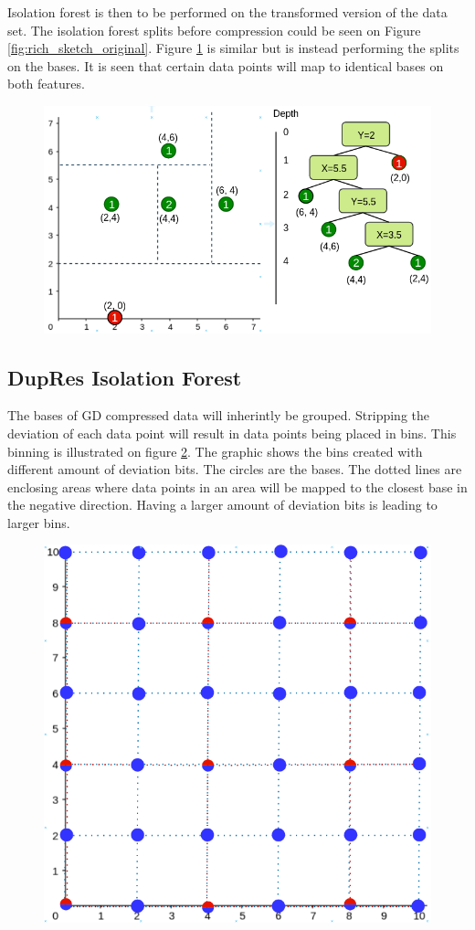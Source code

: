 Isolation forest is then to be performed on the transformed version of the data set. The isolation forest splits before compression could be seen on Figure \ref{fig:rich_sketch_original}. Figure \ref{fig:rich_sketch_bases} is similar but is instead performing the splits on the bases. It is seen that certain data points will map to identical bases on both features.  

\begin{figure}
  \centering
  \includegraphics[width=\linewidth]{images/rich_sketch_bases.png}
  \caption{}
  \label{fig:rich_sketch_bases}
\end{figure}


\subsection{DupRes Isolation Forest}
The bases of GD compressed data will inherintly be grouped. Stripping the deviation of each data point will result in data points being placed in bins. This binning is illustrated on figure \ref*{fig:binning}. The graphic shows the bins created with different amount of deviation bits. The circles are the bases. The dotted lines are enclosing areas where data points in an area will be mapped to the closest base in the negative direction. Having a larger amount of deviation bits is leading to larger bins. 

\begin{figure}
  \centering
  \includegraphics[width=0.5\linewidth]{images/binning.png}
  \caption{}
  \label{fig:binning}
\end{figure}

